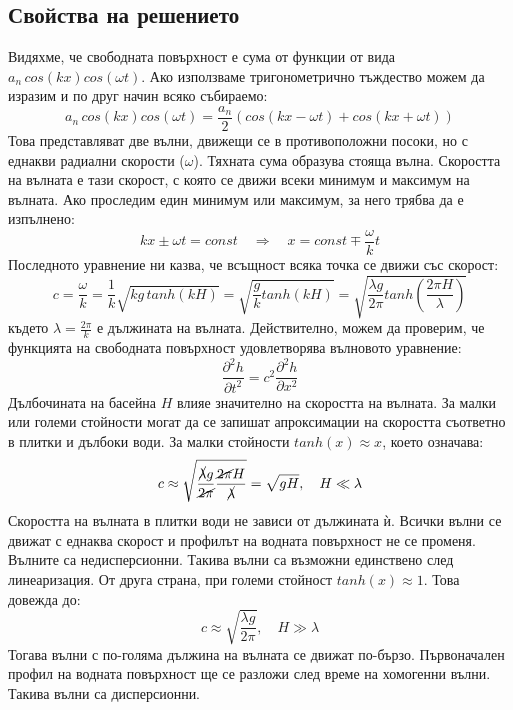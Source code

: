 \documentclass[12pt]{article}
\numberwithin{equation}{section}
\begin{document}
\subsection{Свойства на решението}
Видяхме, че свободната повърхност е сума от функции от вида $a_n \, cos(kx)cos(\omega t)$. Ако използваме тригонометрично тъждество можем да изразим и по друг начин всяко събираемо:
\begin{equation}
    a_n \, cos(kx)cos(\omega t)=\frac{a_n}{2}\left( cos(kx - \omega t) + cos(kx + \omega t) \right)
\end{equation}
Това представляват две вълни, движещи се в противоположни посоки, но с еднакви радиални скорости ($\omega$). Тяхната сума образува стояща вълна. Скоростта на вълната е тази скорост, с която се движи всеки минимум и максимум на вълната\cite{wave-speed}. Ако проследим един минимум или максимум, за него трябва да е изпълнено:
\begin{equation}
    kx \pm \omega t = const \quad \Rightarrow \quad x = const \mp \frac{\omega}{k}t
\end{equation}
Последното уравнение ни казва, че всъщност всяка точка се движи със скорост:
\begin{equation}
    c = \frac{\omega}{k}
    = \frac{1}{k}\sqrt{kg \, tanh(kH)}
    = \sqrt{\frac{g}{k} tanh(kH)}
    = \sqrt{\frac{\lambda g}{2\pi} tanh(\frac{2\pi H}{\lambda})}
\end{equation}
където $\lambda = \frac{2\pi}{k}$ е дължината на вълната. Действително, можем да проверим, че функцията на свободната повърхност удовлетворява вълновото уравнение:
\begin{equation}
    \frac{\partial^2 h}{\partial t^2} = c^2 \frac{\partial^2 h}{\partial x^2}
\end{equation}
Дълбочината на басейна $H$ влияе значително на скоростта на вълната. За малки или големи стойности могат да се запишат апроксимации на скоростта съответно в плитки и дълбоки води. За малки стойности $tanh(x) \approx x$, което означава:
\begin{equation}
    c \approx \sqrt{\frac{\cancel{\lambda} g}{\cancel{2\pi}} \frac{\cancel{2\pi} H}{\cancel{\lambda}}}
    = \sqrt{g H},
    \quad H \ll \lambda
\end{equation}
Скоростта на вълната в плитки води не зависи от дължината ѝ. Всички вълни се движат с еднаква скорост и профилът на водната повърхност не се променя. Вълните са недисперсионни. Такива вълни са възможни единствено след линеаризация. От друга страна, при големи стойност $tanh(x) \approx 1$. Това довежда до:
\begin{equation}
    c \approx \sqrt{\frac{\lambda g}{2\pi}},
    \quad H \gg \lambda
\end{equation}
Тогава вълни с по-голяма дължина на вълната се движат по-бързо. Първоначален профил на водната повърхност ще се разложи след време на хомогенни вълни. Такива вълни са дисперсионни.
\end{document}
